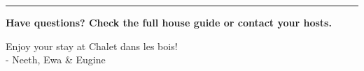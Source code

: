 \documentclass[11pt,a4paper]{article}
\newcommand{\separator}{\vspace{1em}\hrule\vspace{1em}}
\begin{document}
\vfill

\separator
\vspace{1em}
\textbf{Have questions? Check the full house guide or contact your hosts.}

Enjoy your stay at Chalet dans les bois! \\

- Neeth, Ewa \& Eugine
\end{document}
